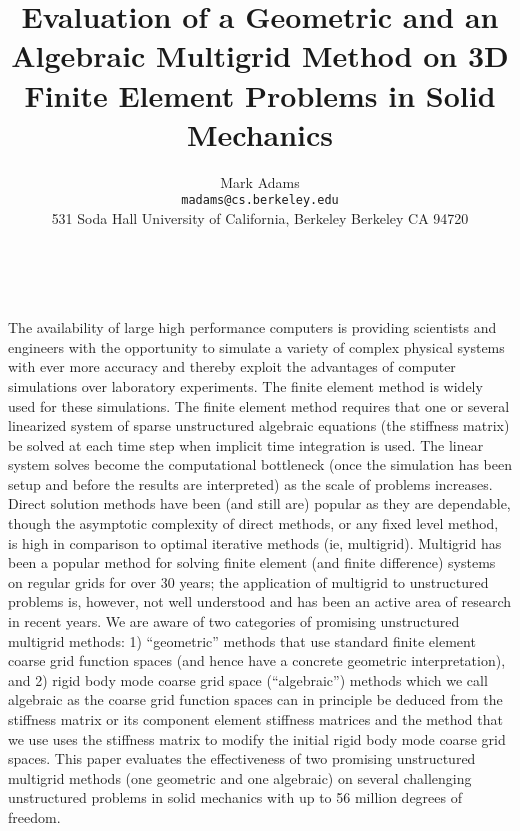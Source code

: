 \documentclass[11pt]{article}
\date{ ~ \hspace{-4mm}}
\title{Evaluation of a Geometric and an Algebraic Multigrid Method on 3D Finite Element Problems in Solid Mechanics  }
\author{Mark Adams \\ {\tt madams@cs.berkeley.edu} \\ 531 Soda Hall University of California, Berkeley Berkeley CA 94720}
\begin{document}
\maketitle
\thispagestyle{empty}





 



The availability of large high performance computers is providing
scientists and engineers with the opportunity to simulate a variety of
complex physical systems with ever more accuracy and thereby exploit the
advantages of computer simulations over laboratory experiments.  The
finite element method is widely used for these simulations.   The finite
element method requires that one or several linearized system of sparse
unstructured algebraic equations (the stiffness matrix) be solved at
each time step when implicit time integration is used.  The linear
system solves become the computational bottleneck (once the simulation
has been setup and before the results are interpreted) as the scale of
problems increases.  Direct solution methods have been (and still are)
popular as they are dependable, though the asymptotic complexity of
direct methods, or any fixed level method, is high in comparison to
optimal iterative methods (ie, multigrid).  Multigrid has been a popular
method for solving finite element (and finite difference) systems on
regular grids for over 30 years; the application of multigrid to
unstructured problems is, however, not well understood and has been an
active area of research in recent years.  We are aware of two categories
of promising unstructured multigrid methods: 1) ``geometric'' methods
that use standard finite element coarse grid function spaces (and hence
have a concrete geometric interpretation), and 2) rigid body mode coarse
grid space (``algebraic'') methods which we call algebraic as the coarse
grid function spaces can in principle be deduced from the stiffness
matrix or its component element stiffness matrices and the method that
we use uses the stiffness matrix to modify the initial rigid body mode
coarse grid spaces.  This paper evaluates the effectiveness of two
promising unstructured multigrid methods (one geometric and one
algebraic) on several challenging unstructured problems in solid
mechanics with up to 56 million degrees of freedom.
\end{document}
